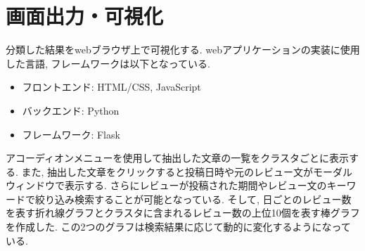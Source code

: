 
\section{画面出力・可視化}
分類した結果をwebブラウザ上で可視化する. webアプリケーションの実装に使用した言語, フレームワークは以下となっている. 
\begin{itemize}
    \item フロントエンド: HTML/CSS, JavaScript
    \item バックエンド: Python
    \item フレームワーク: Flask
\end{itemize}

アコーディオンメニューを使用して抽出した文章の一覧をクラスタごとに表示する. また, 抽出した文章をクリックすると投稿日時や元のレビュー文がモーダルウィンドウで表示する. 
さらにレビューが投稿された期間やレビュー文のキーワードで絞り込み検索することが可能となっている. そして, 日ごとのレビュー数を表す折れ線グラフとクラスタに含まれるレビュー数の上位10個を表す棒グラフを作成した. この2つのグラフは検索結果に応じて動的に変化するようになっている. 